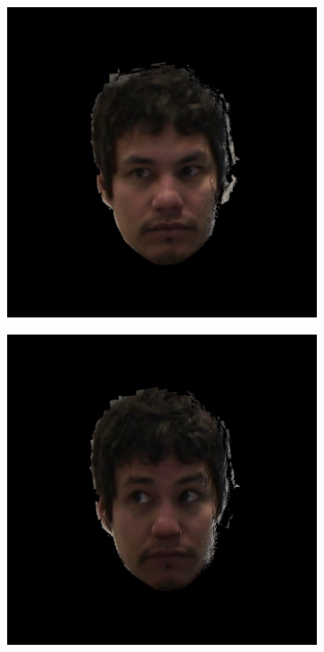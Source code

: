 \begin{figure}[h]
	\centering
	\begin{subfigure}[b]{0.32\textwidth}
		\includegraphics[width=1.1\linewidth]{./img/eyeimages/s1.jpg}
	\end{subfigure}
	\begin{subfigure}[b]{0.32\textwidth}
		\includegraphics[width=1.1\linewidth]{./img/eyeimages/s2.jpg}

\end{subfigure}
\end{figure}
